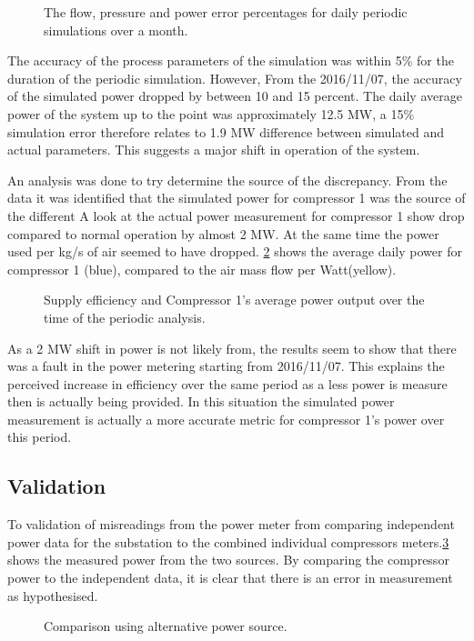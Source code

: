 	\begin{figure}[h]
		\centering
		
		\caption{The flow, pressure and power error percentages for daily periodic simulations over a month.}
		\label{fig: Periodic simulation}
	\end{figure}   
The accuracy of the process parameters of the simulation was within 5\% for the duration of the periodic simulation. However, From the 2016/11/07, the accuracy of the simulated power dropped by between 10 and 15 percent. The daily average power of the system up to the point was approximately 12.5 MW, a 15\% simulation error therefore relates to 1.9 MW difference between simulated and actual parameters. This suggests a major shift in operation of the system.
\par 
An analysis was done to try determine the source of the discrepancy. From the data it was identified that the simulated power for compressor 1 was the source of the different A look at the actual power measurement for compressor 1 show drop compared to normal operation by almost 2 MW. At the same time the power used per kg/s of air seemed to have dropped. \cref{fig: MeasurementAccuracy.} shows the average daily power for compressor 1 (blue), compared to the air mass flow per Watt(yellow). 
	\begin{figure}[h]
		\centering
		
		\caption{Supply efficiency and Compressor 1's average power output over the time of the periodic analysis.}
		\label{fig: MeasurementAccuracy.}
	\end{figure} 
As a 2 MW shift in power is not likely from, the results seem to show that there was a fault in the power metering starting from 2016/11/07. This explains the perceived increase in efficiency over the same period as a less power is measure then is actually being provided. In this situation the simulated power measurement is actually a more accurate metric for compressor 1's power over this period.  
   \subsection{Validation}
To validation of misreadings from the power meter from comparing independent power data for the substation to the combined individual compressors meters.\cref{fig: Corrected Periodic simulation} shows the measured power from the two sources. By comparing the compressor power to the independent data, it is clear that there is an error in measurement as hypothesised.
	\begin{figure}[h]
		\centering
		
		\caption{Comparison using alternative power source.}
		\label{fig: Corrected Periodic simulation}
	\end{figure}    
	
